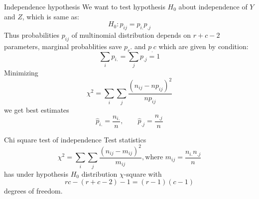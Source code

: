 \documentclass[smaller]{beamer}
\begin{document}
\begin{frame}{Independence hypothesis}
We want to test hypothesis $H_0$ about independence of $Y$ and $Z$, which is same as:
\[
  H_0: p_{ij}=p_{i.}p_{.j}
\]
Thus probabilities $p_{ij}$ of multinomial distribution depends on $r+c-2$ parameters,
marginal probablities save $p_r.$ and $p_.c$ which are given by condition:
\[
   \sum_i p_{i.} = \sum_j p_{.j} = 1
\]
Minimizing 
\[
  \chi^2 = \sum_i \sum_j \frac{ (n_{ij} - np_{ij})^2 }{np_{ij}}
\]
we get best estimates
\[
   \hat{p}_{i.} = \frac{n_{i.}}{n}, \qquad \hat{p}_{.j}=\frac{n_{.j}}{n}
\]

\end{frame}

\begin{frame}{Chi square test of independence}
Test statistics
\[
  \chi^2 = \sum_i \sum_j \frac{ (n_{ij} - m_{ij})^2 }{m_{ij}}, \text{where } m_{ij}=\frac{n_{i.}n_{.j}}{n}
\]
has under hypothesis $H_0$ distribution $\chi$-square with 
\[
   rc-(r+c-2)-1 =  (r-1)(c-1)
\]
degrees of freedom.
\end{frame}


\end{document}
